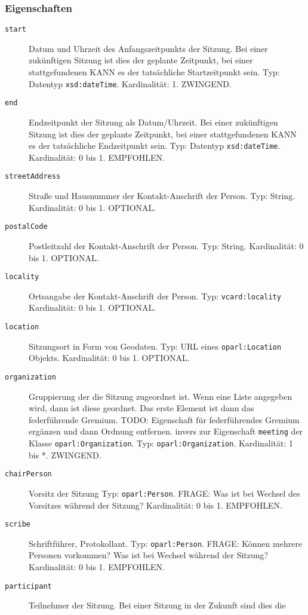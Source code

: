 \documentclass[,a4paper]{article}
\begin{document}
\subsubsection{Eigenschaften}\label{eigenschaften-4}

\begin{description}
\item[\texttt{start}]
Datum und Uhrzeit des Anfangszeitpunkts der Sitzung. Bei einer
zukünftigen Sitzung ist dies der geplante Zeitpunkt, bei einer
stattgefundenen KANN es der tatsächliche Startzeitpunkt sein. Typ:
Datentyp \texttt{xsd:dateTime}. Kardinalität: 1. ZWINGEND.
\item[\texttt{end}]
Endzeitpunkt der Sitzung als Datum/Uhrzeit. Bei einer zukünftigen
Sitzung ist dies der geplante Zeitpunkt, bei einer stattgefundenen KANN
es der tatsächliche Endzeitpunkt sein. Typ: Datentyp
\texttt{xsd:dateTime}. Kardinalität: 0 bis 1. EMPFOHLEN.
\item[\texttt{streetAddress}]
Straße und Hausnummer der Kontakt-Anschrift der Person. Typ: String.
Kardinalität: 0 bis 1. OPTIONAL.
\item[\texttt{postalCode}]
Postleitzahl der Kontakt-Anschrift der Person. Typ: String.
Kardinalität: 0 bis 1. OPTIONAL.
\item[\texttt{locality}]
Ortsangabe der Kontakt-Anschrift der Person. Typ:
\texttt{vcard:locality} Kardinalität: 0 bis 1. OPTIONAL.
\item[\texttt{location}]
Sitzungsort in Form von Geodaten. Typ: URL eines \texttt{oparl:Location}
Objekts. Kardinalität: 0 bis 1. OPTIONAL.
\item[\texttt{organization}]
Gruppierung der die Sitzung zugeordnet ist. Wenn eine Liste angegeben
wird, dann ist diese geordnet. Das erste Element ist dann das
federführende Gremium. TODO: Eigenschaft für federführendes Gremium
ergänzen und dann Ordnung entfernen. invers zur Eigenschaft
\texttt{meeting} der Klasse \texttt{oparl:Organization}. Typ:
\texttt{oparl:Organization}. Kardinalität: 1 bis *. ZWINGEND.
\item[\texttt{chairPerson}]
Vorsitz der Sitzung Typ: \texttt{oparl:Person}. FRAGE: Was ist bei
Wechsel des Vorsitzes während der Sitzung? Kardinalität: 0 bis 1.
EMPFOHLEN.
\item[\texttt{scribe}]
Schriftführer, Protokollant. Typ: \texttt{oparl:Person}. FRAGE: Können
mehrere Personen vorkommen? Was ist bei Wechsel während der Sitzung?
Kardinalität: 0 bis 1. EMPFOHLEN.
\item[\texttt{participant}]
Teilnehmer der Sitzung. Bei einer Sitzung in der Zukunft sind dies die

\end{description}
\end{document}
